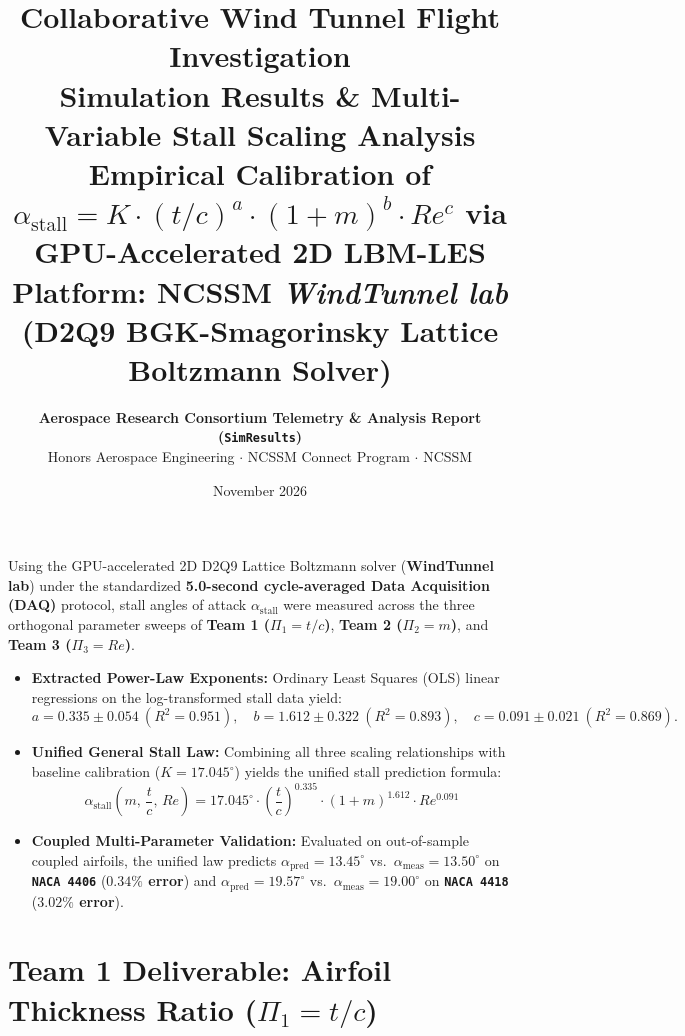 \documentclass[11pt,a4paper]{article}
\title{\vspace{-1.8cm}\textbf{\huge Collaborative Wind Tunnel Flight Investigation}\\[0.15cm]
\textbf{\Large Simulation Results \& Multi-Variable Stall Scaling Analysis}\\[0.1cm]
\normalsize Empirical Calibration of $\alpha_{\text{stall}} = K \cdot (t/c)^a \cdot (1+m)^b \cdot Re^c$ via GPU-Accelerated 2D LBM-LES \\
\vspace{0.1cm}
\small \textbf{Platform:} NCSSM \textit{WindTunnel lab} (D2Q9 BGK-Smagorinsky Lattice Boltzmann Solver)}
\author{\textbf{Aerospace Research Consortium Telemetry \& Analysis Report (\texttt{SimResults})} \\
Honors Aerospace Engineering $\cdot$ NCSSM Connect Program $\cdot$ NCSSM}
\date{November 2026}
\begin{document}
\maketitle
\vspace{-0.65cm}

\begin{tcolorbox}[title=Executive Summary of Stall Scaling Results, colframe=blue!65!black]
\small
Using the GPU-accelerated 2D D2Q9 Lattice Boltzmann solver (\textbf{WindTunnel lab}) under the standardized \textbf{5.0-second cycle-averaged Data Acquisition (DAQ)} protocol, stall angles of attack $\alpha_{\text{stall}}$ were measured across the three orthogonal parameter sweeps of \textbf{Team 1 ($\Pi_1 = t/c$)}, \textbf{Team 2 ($\Pi_2 = m$)}, and \textbf{Team 3 ($\Pi_3 = Re$)}.
\begin{itemize}[leftmargin=*, itemsep=1pt, topsep=2pt]
    \item \textbf{Extracted Power-Law Exponents:} Ordinary Least Squares (OLS) linear regressions on the log-transformed stall data yield:
    \begin{equation}
        a = 0.335 \pm 0.054 \ (R^2 = 0.951), \quad
        b = 1.612 \pm 0.322 \ (R^2 = 0.893), \quad
        c = 0.091 \pm 0.021 \ (R^2 = 0.869).
    \end{equation}
    \item \textbf{Unified General Stall Law:} Combining all three scaling relationships with baseline calibration ($K = 17.045^\circ$) yields the unified stall prediction formula:
    \begin{equation}
        \boxed{\alpha_{\text{stall}}\!\left(m,\, \frac{t}{c},\, Re\right) = 17.045^\circ \cdot \left(\frac{t}{c}\right)^{0.335} \cdot \left(1 + m\right)^{1.612} \cdot Re^{0.091}}
    \end{equation}
    \item \textbf{Coupled Multi-Parameter Validation:} Evaluated on out-of-sample coupled airfoils, the unified law predicts $\alpha_{\text{pred}} = 13.45^\circ$ vs.\ $\alpha_{\text{meas}} = 13.50^\circ$ on \textbf{\texttt{NACA 4406}} (\textbf{$0.34\%$ error}) and $\alpha_{\text{pred}} = 19.57^\circ$ vs.\ $\alpha_{\text{meas}} = 19.00^\circ$ on \textbf{\texttt{NACA 4418}} (\textbf{$3.02\%$ error}).
\end{itemize}
\end{tcolorbox}

\section{Team 1 Deliverable: Airfoil Thickness Ratio (\texorpdfstring{$\Pi_1 = t/c$}{Pi1 = t/c})}
\end{document}
